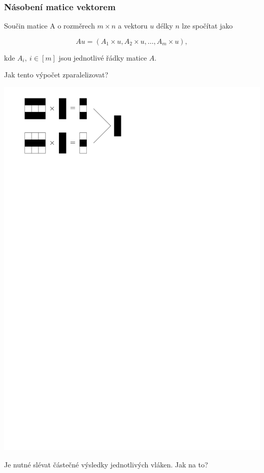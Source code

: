 \documentclass[usenames,dvipsnames,9pt]{beamer}
\begin{document}
\begin{frame}
  \frametitle{Násobení matice vektorem}
  
  Součin matice A o rozměrech $m \times n$ a vektoru $u$ délky $n$ lze spočítat jako 
  
    \begin{equation*}
  Au = (A_1\times u, A_2 \times u, \dots, A_m \times u),
  \end{equation*}
  
  kde $A_i,~i\in [m]$ jsou jednotlivé řádky matice $A$.
  
   \pause\vspace{1em}
  
  \begin{center}
  \Large Jak tento výpočet zparalelizovat?
  \end{center}
  
  \pause
  
  \begin{center}
\includegraphics[width=0.5\linewidth]{figs/mmult.pdf}
\end{center}

Je nutné slévat částečné výsledky jednotlivých vláken. Jak na to?
  

\end{frame}
\end{document}

